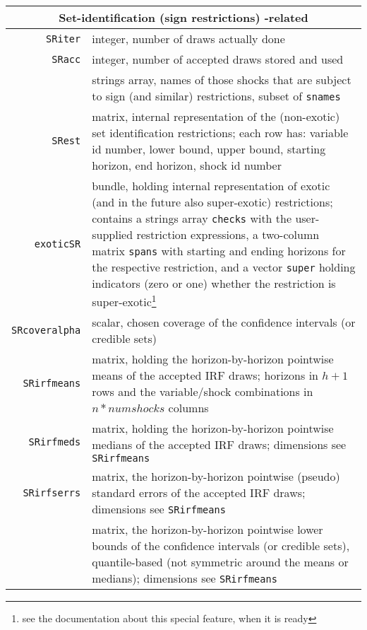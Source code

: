 \documentclass[a4paper,10pt]{article}
\newcommand{\dtk}[1]{\texttt{\detokenize{#1}}}
\begin{document}
    \begin{tabular}{rp{}}
    \hline
    \multicolumn{2}{c}{\textbf{Set-identification (sign restrictions) -related}} \\
    \hline 
    \texttt{SRiter} & integer, number of draws actually done \\
    \texttt{SRacc} & integer, number of accepted draws stored and used\\
    \dtk{SRid_snames} & strings array, names of those shocks that are subject 
      to sign (and similar) restrictions, subset of \texttt{snames}\\
    \texttt{SRest} & matrix, internal representation of the (non-exotic) set identification
    restrictions; each row has: variable id number, lower bound, upper bound, starting
   horizon, end horizon, shock id number  \\
   \texttt{exoticSR} & bundle, holding internal representation of exotic (and in the future also 
   super-exotic) restrictions; contains a strings array \texttt{checks} with the user-supplied
   restriction expressions, a two-column matrix \texttt{spans} with starting and ending horizons
   for the respective restriction, and a vector \texttt{super} holding indicators (zero or one) 
   whether the restriction is super-exotic\footnote{see the documentation about this special feature,
   when it is ready}\\
   \texttt{SRcoveralpha} & scalar, chosen coverage of the confidence intervals (or credible sets)\\
   
   \texttt{SRirfmeans} & matrix, holding the horizon-by-horizon pointwise means of 
   the accepted IRF draws; horizons in $h+1$ rows and the variable/shock combinations
   in $n*numshocks$ columns\\
   
    \texttt{SRirfmeds} & matrix, holding the horizon-by-horizon pointwise medians of 
   the accepted IRF draws; dimensions see  \texttt{SRirfmeans}\\
   
   \texttt{SRirfserrs} & matrix, the horizon-by-horizon pointwise (pseudo) standard errors
  of the accepted IRF draws;  dimensions see \texttt{SRirfmeans}\\
  
  \dtk{SRlo_cb} & matrix, the horizon-by-horizon pointwise lower bounds of the 
  confidence intervals (or credible sets), quantile-based (not symmetric around the 
  means or medians); dimensions see  \texttt{SRirfmeans}\\
  

\end{tabular}
\end{document}
